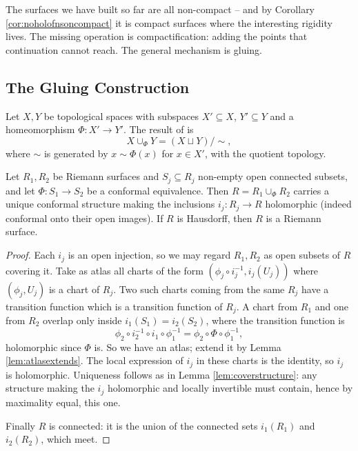 \documentclass[a4paper]{scrartcl}
\begin{document}
The surfaces we have built so far are all non-compact -- and by Corollary
\ref{cor:noholofnsoncompact} it is compact surfaces where the interesting rigidity lives.
The missing operation is compactification: adding the points that continuation cannot
reach. The general mechanism is gluing.

\subsection{The Gluing Construction}

\begin{definition}[Gluing]
	Let $X, Y$ be topological spaces with subspaces $X' \subseteq X$, $Y' \subseteq Y$ and a
	homeomorphism $\Phi : X' \to Y'$. The result of 
	is
	$$
	X \cup_\Phi Y = (X \sqcup Y)/\!\sim,
	$$
	where $\sim$ is generated by $x \sim \Phi(x)$ for $x \in X'$, with the quotient topology.
\end{definition}

\begin{proposition}\label{prop:gluingsurfaces}
	Let $R_1, R_2$ be Riemann surfaces and $S_j \subseteq R_j$ non-empty open connected
	subsets, and let $\Phi : S_1 \to S_2$ be a conformal equivalence. Then $R = R_1\cup_\Phi R_2$
	carries a unique conformal structure making the inclusions $i_j : R_j \to R$ holomorphic
	(indeed conformal onto their open images). If $R$ is Hausdorff, then $R$ is a Riemann
	surface.
\end{proposition}

\begin{proof}
	Each $i_j$ is an open injection, so we may regard $R_1, R_2$ as open subsets of $R$
	covering it. Take as atlas all charts of the form $(\phi_j\circ i_j^{-1}, i_j(U_j))$
	where $(\phi_j, U_j)$ is a chart of $R_j$. Two such charts coming from the same $R_j$
	have a transition function which is a transition function of $R_j$. A chart from $R_1$
	and one from $R_2$ overlap only inside $i_1(S_1) = i_2(S_2)$, where the transition
	function is
	$$
	\phi_2 \circ i_2^{-1}\circ i_1 \circ \phi_1^{-1} = \phi_2\circ \Phi \circ \phi_1^{-1},
	$$
	holomorphic since $\Phi$ is. So we have an atlas; extend it by Lemma
	\ref{lem:atlasextends}. The local expression of $i_j$ in these charts is the identity, so
	$i_j$ is holomorphic. Uniqueness follows as in Lemma \ref{lem:coverstructure}: any
	structure making the $i_j$ holomorphic and locally invertible must contain, hence by
	maximality equal, this one.

	Finally $R$ is connected: it is the union of the connected sets $i_1(R_1)$ and
	$i_2(R_2)$, which meet.
\end{proof}
\end{document}
